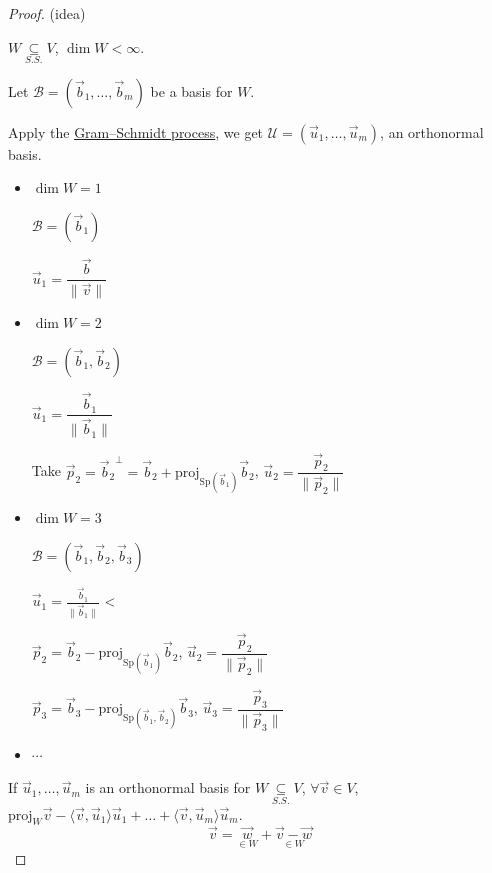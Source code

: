 \documentclass[11pt,fleqn]{book} %
\begin{document}
\begin{proof}
    (idea)
    
    $W \underset{S.S.}{\subseteq} V$, $\dim W < \infty$. 

    Let $\mathcal{B} = (\vec{b}_1, \dots, \vec{b}_m)$ be a basis for $W$. 

    Apply the \hyperref[https://en.wikipedia.org/wiki/Gram–Schmidt_process]{Gram–Schmidt process}, we get $\mathcal{U} = (\vec{u}_1, \dots, \vec{u}_m)$, an orthonormal basis. 
    
    \begin{itemize}
        \item $\dim W = 1$ 
        
        $\mathcal{B} = (\vec{b}_1)$
        
        $\vec{u}_1 = \dfrac{\vec{b}}{\|\vec{v}\|}$
        
        \item $\dim W =2$
        
        $\mathcal{B} = (\vec{b}_1, \vec{b}_2)$ 
        
        $\vec{u}_1 = \dfrac{\vec{b}_1}{\|\vec{b}_1\|}$ 
        
        Take $\vec{p}_2 = {\vec{b}_2}^\perp = \vec{b}_2 + \mathrm{proj}_{\mathrm{Sp}(\vec{b}_1)}\vec{b}_2$, $\vec{u}_2 = \dfrac{\vec{p}_2}{\|\vec{p}_2\|}$
        
        \item $\dim W = 3$ 
        
        $\mathcal{B} = (\vec{b}_1, \vec{b}_2, \vec{b}_3)$ 
        
        $\vec{u}_1 = \frac{\vec{b}_1}{\|\vec{b}_1\|}$ <
        
        $\vec{p}_2 = \vec{b}_2 - \mathrm{proj}_{\mathrm{Sp}(\vec{b}_1)}\vec{b}_2$, $\vec{u}_2 = \dfrac{\vec{p}_2}{\|\vec{p}_2\|}$ 
        
        $\vec{p}_3 = \vec{b}_3 - \mathrm{proj}_{\mathrm{Sp}(\vec{b}_1, \vec{b}_2)}\vec{b}_3$, $\vec{u}_3 = \dfrac{\vec{p}_3}{\|\vec{p}_3\|}$
        
        \item $\cdots$
    \end{itemize}

    If $\vec{u}_1, \dots, \vec{u}_m$ is an orthonormal basis for $W \underset{S.S.}{\subseteq} V$, $\forall \vec{v} \in V$, $\mathrm{proj}_W\vec{v} - \langle \vec{v}, \vec{u}_1 \rangle\vec{u}_1 + \dots + \langle \vec{v}, \vec{u}_m \rangle\vec{u}_m$. 
    $$\vec{v} = \underset{\in W}{\vec{w}} + \underset{\in W}{\vec{v} - \vec{w}}$$
\end{proof}
\end{document}

